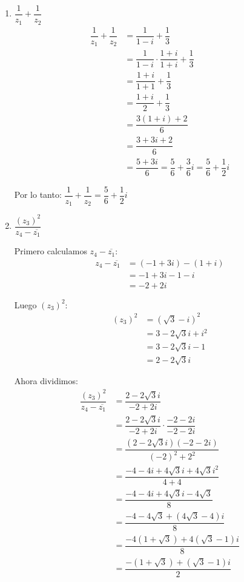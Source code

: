 \documentclass[12pt]{article}
\begin{document}
\begin{enumerate}[label=\alph*.-]
    \begin{enumerate}[label=\roman*)]
        \item $\dfrac{1}{z_1} + \dfrac{1}{z_2}$
        \begin{align*}
        \dfrac{1}{z_1} + \dfrac{1}{z_2} &= \dfrac{1}{1-i} + \dfrac{1}{3} \\[0.3em]
        &= \dfrac{1}{1-i} \cdot \dfrac{1+i}{1+i} + \dfrac{1}{3} \\[0.3em]
        &= \dfrac{1+i}{1+1} + \dfrac{1}{3} \\[0.3em]
        &= \dfrac{1+i}{2} + \dfrac{1}{3} \\[0.3em]
        &= \dfrac{3(1+i) + 2}{6} \\[0.3em]
        &= \dfrac{3+3i+2}{6} \\[0.3em]
        &= \dfrac{5+3i}{6} = \dfrac{5}{6} + \dfrac{3}{6}i = \dfrac{5}{6} + \dfrac{1}{2}i
        \end{align*}
        
        Por lo tanto: $\boxed{\dfrac{1}{z_1} + \dfrac{1}{z_2} = \dfrac{5}{6} + \dfrac{1}{2}i}$

        \item $\dfrac{(z_3)^2}{z_4 - \overline{z_1}}$
        
        Primero calculamos $z_4 - \overline{z_1}$:
        \begin{align*}
        z_4 - \overline{z_1} &= (-1+3i) - (1+i) \\[0.3em]
        &= -1+3i-1-i \\[0.3em]
        &= -2 + 2i
        \end{align*}
        
        Luego $(z_3)^2$:
        \begin{align*}
        (z_3)^2 &= (\sqrt{3}-i)^2 \\[0.3em]
        &= 3 - 2\sqrt{3}i + i^2 \\[0.3em]
        &= 3 - 2\sqrt{3}i - 1 \\[0.3em]
        &= 2 - 2\sqrt{3}i
        \end{align*}
        
        Ahora dividimos:
        \begin{align*}
        \dfrac{(z_3)^2}{z_4 - \overline{z_1}} &= \dfrac{2-2\sqrt{3}i}{-2+2i} \\[0.3em]
        &= \dfrac{2-2\sqrt{3}i}{-2+2i} \cdot \dfrac{-2-2i}{-2-2i} \\[0.3em]
        &= \dfrac{(2-2\sqrt{3}i)(-2-2i)}{(-2)^2 + 2^2} \\[0.3em]
        &= \dfrac{-4-4i+4\sqrt{3}i+4\sqrt{3}i^2}{4+4} \\[0.3em]
        &= \dfrac{-4-4i+4\sqrt{3}i-4\sqrt{3}}{8} \\[0.3em]
        &= \dfrac{-4-4\sqrt{3} + (4\sqrt{3}-4)i}{8} \\[0.3em]
        &= \dfrac{-4(1+\sqrt{3}) + 4(\sqrt{3}-1)i}{8} \\[0.3em]
        &= \dfrac{-(1+\sqrt{3}) + (\sqrt{3}-1)i}{2}
        \end{align*}
        

\end{enumerate}
\end{enumerate}
\end{document}
